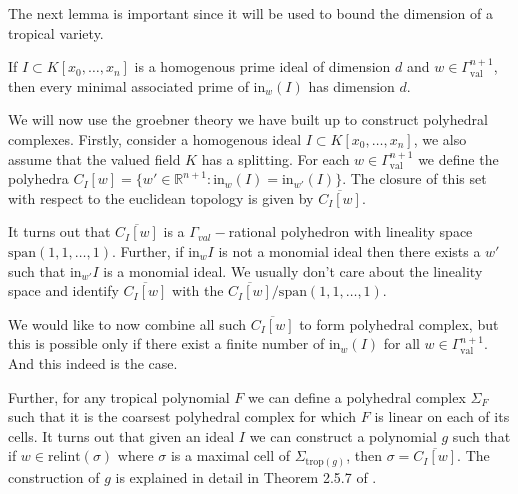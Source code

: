     The next lemma is important since it will be used to bound the dimension of a tropical variety.
    \begin{lemma}
        If $I \subset K[x_0,\dots,x_n]$ is a homogenous prime ideal of dimension $d$ and $w \in \Gamma_{\text{val}}^{n+1}$, then every minimal associated prime of $\text{in}_{w}(I)$ has dimension $d$.
    \end{lemma}
    \par We will now use the groebner theory we have built up to construct polyhedral complexes. 
    Firstly, consider a homogenous ideal $I \subset K[x_0,\dots,x_n]$, we also assume that the valued field $K$ has a splitting.
    For each $w \in \Gamma_{\text{val}}^{n+1}$ we define the polyhedra $C_{I}[w] = \{w' \in \mathbb{R}^{n+1}: \text{in}_{w}(I) = \text{in}_{w'}(I)\}$.
    The closure of this set with respect to the euclidean topology is given by $\overline{C_{I}[w]}$.
    \par It turns out that $\overline{C_{I}[w]}$ is a $\Gamma_{val}-$rational polyhedron with lineality space $\text{span}(1,1,\dots,1)$. 
    Further, if $\text{in}_{w}I$ is not a monomial ideal then there exists a $w'$ such that $\text{in}_{w'}I$ is a monomial ideal.
    We usually don't care about the lineality space and identify $\overline{C_{I}[w]}$ with the $\overline{C_{I}[w]}/\text{span}(1,1,\dots,1)$.
    \par We would like to now combine all such $\overline{C_{I}[w]}$ to form polyhedral complex, but this is possible only if there exist a finite number of $\text{in}_{w}(I)$ for all $w \in \Gamma_{\text{val}}^{n+1}$. And this indeed is the case.
    \par Further, for any tropical polynomial $F$ we can define a polyhedral complex $\Sigma_{F}$ such that it is the coarsest polyhedral complex for which $F$ is linear on each of its cells. 
    It turns out that given an ideal $I$ we can construct a polynomial $g$ such that if $w \in \text{relint}(\sigma)$ where $\sigma$ is a maximal cell of $\Sigma_{\text{trop}(g)}$, then $\sigma = \overline{C_I[w]}$. 
    The construction of $g$ is explained in detail in Theorem 2.5.7 of \cite{maclagan2015introduction}.
